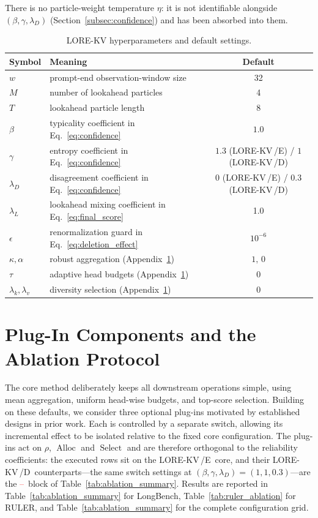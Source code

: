 \documentclass{article} %
\newcommand{\tbd}{\textcolor{red}{--}}
\newcommand{\lorekvE}{LORE-KV\,/E}
\newcommand{\lorekvD}{LORE-KV\,/D}
\begin{document}
There is no particle-weight temperature $\eta$: it is not identifiable alongside $(\beta,\gamma,\lambda_D)$ (Section~\ref{subsec:confidence}) and has been absorbed into them.
\begin{table}[t]
\caption{LORE-KV hyperparameters and default settings.}
\label{tab:hyperparams}
\centering
\begin{tabular}{llc}
\toprule
Symbol & Meaning & Default \\
\midrule
$w$ & prompt-end observation-window size & 32 \\
$M$ & number of lookahead particles & 4 \\
$T$ & lookahead particle length & 8 \\
$\beta$ & typicality coefficient in Eq.~\eqref{eq:confidence} & $1.0$ \\
$\gamma$ & entropy coefficient in Eq.~\eqref{eq:confidence} & $1.3$ (\lorekvE) / $1$ (\lorekvD) \\
$\lambda_D$ & disagreement coefficient in Eq.~\eqref{eq:confidence} & $0$ (\lorekvE) / $0.3$ (\lorekvD) \\
$\lambda_L$ & lookahead mixing coefficient in Eq.~\eqref{eq:final_score} & 1.0 \\
$\epsilon$ & renormalization guard in Eq.~\eqref{eq:deletion_effect} & $10^{-6}$ \\
\midrule
$\kappa,\alpha$ & robust aggregation (Appendix~\ref{sec:ablation_components}) & $1,\,0$ \\
$\tau$ & adaptive head budgets (Appendix~\ref{sec:ablation_components}) & $0$ \\
$\lambda_k,\lambda_v$ & diversity selection (Appendix~\ref{sec:ablation_components}) & $0$ \\
\bottomrule
\end{tabular}
\end{table}

\section{Plug-In Components and the Ablation Protocol}
\label{sec:ablation_components}

The core method deliberately keeps all downstream operations simple, using mean aggregation, uniform head-wise budgets, and top-score selection. Building on these defaults, we consider three optional plug-ins motivated by established designs in prior work. Each is controlled by a separate switch, allowing its incremental effect to be isolated relative to the fixed core configuration. The plug-ins act on $\rho$, $\operatorname{Alloc}$ and $\operatorname{Select}$ and are therefore orthogonal to the reliability coefficients: the executed rows sit on the \lorekvE\ core, and their \lorekvD\ counterparts---the same switch settings at $(\beta,\gamma,\lambda_D)=(1,1,0.3)$---are the \tbd\ block of Table~\ref{tab:ablation_summary}. Results are reported in Table~\ref{tab:ablation_summary} for LongBench, Table~\ref{tab:ruler_ablation} for RULER, and Table~\ref{tab:ablation_summary} for the complete configuration grid.
\end{document}
